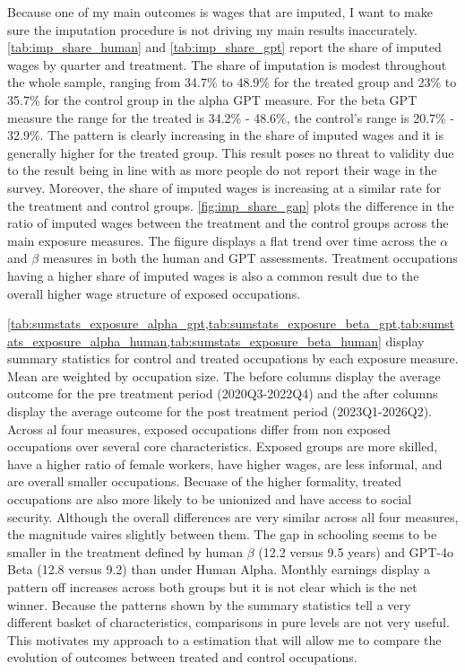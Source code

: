 Because one of my main outcomes is wages that are imputed, I want to make sure the imputation procedure is not driving my main results inaccurately. \cref{tab:imp_share_human} and \cref{tab:imp_share_gpt} report the share of imputed wages by quarter and treatment. The share of imputation is modest throughout the whole sample, ranging from 34.7\% to 48.9\% for the treated group and 23\% to 35.7\% for the control group in the alpha GPT measure. For the beta GPT measure the range for the treated is 34.2\% - 48.6\%, the control's range is 20.7\% - 32.9\%. The pattern is clearly increasing in the share of imputed wages and it is generally higher for the treated group. This result poses no threat to validity due to the result being in line with \cite{imput} as more people do not report their wage in the survey. Moreover, the share of imputed wages is increasing at a similar rate for the treatment and control groups. \cref{fig:imp_share_gap} plots the difference in the ratio of imputed wages between the treatment and the control groups across the main exposure measures. The fiigure displays a flat trend over time across the $\alpha$ and $\beta$ measures in both the human and GPT assessments. Treatment occupations having a higher share of imputed wages is also a common result due to the overall higher wage structure of exposed occupations.


\cref{tab:sumstats_exposure_alpha_gpt,tab:sumstats_exposure_beta_gpt,tab:sumstats_exposure_alpha_human,tab:sumstats_exposure_beta_human} display summary statistics for control and treated occupations by each exposure measure. Mean are weighted by occupation size. The before columns display the average outcome for the pre treatment period (2020Q3-2022Q4) and the after columns display the average outcome for the post treatment period (2023Q1-2026Q2). Across al four measures, exposed occupations differ from non exposed occupations over several core characteristics. Exposed groups are more skilled, have a higher ratio of female workers, have higher wages, are less informal, and are overall smaller occupations. Becuase of the higher formality, treated occupations are also more likely to be unionized and have access to social security. Although the overall differences are very similar across all four measures, the magnitude vaires slightly between them. The gap in schooling seems to be smaller in the treatment defined by human $\beta$ (12.2 versus 9.5 years) and GPT-4o Beta (12.8 versus 9.2) than under Human Alpha. Monthly earnings display a pattern off increases across both groups but it is not clear which is the net winner. Because the patterns shown by the summary statistics tell a very different basket of characteristics, comparisons in pure levels are not very useful. This motivates my approach to a  estimation that will allow me to compare the evolution of outcomes between treated and control occupations.

